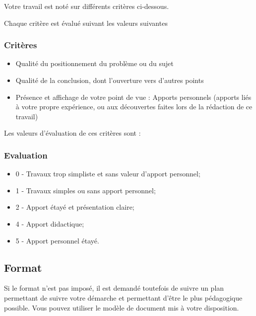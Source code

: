 
Votre travail est noté sur différents critères ci-dessous.

Chaque critère est évalué suivant les valeurs suivantes

\begin{frame}
\frametitle<presentation>{Critères}

\begin{itemize}
  \item Qualité du positionnement du problème ou du sujet
  \item Qualité de la conclusion, dont l'ouverture vers d'autres points
  \item Présence et affichage de votre point de vue : Apports personnels (apports liés à votre propre expérience, ou aux découvertes  faites lors de la rédaction de ce travail)
\end{itemize}

\end{frame}
Les valeurs d'évaluation de ces critères sont :

\begin{frame}
\frametitle<presentation>{Evaluation}

\begin{itemize}
  \item 0 - Travaux trop simpliste et sans valeur d'apport personnel;
  \item 1 - Travaux simples ou sans apport personnel;
  \item 2 - Apport étayé et présentation claire;
  \item 4 - Apport didactique;
  \item 5 - Apport personnel étayé.
\end{itemize}
\end{frame}

\subsection{Format}

Si le format n'est pas imposé, il est demandé toutefois de suivre un plan permettant de suivre votre démarche et permettant d'être le plus pédagogique possible.
Vous pouvez utiliser le modèle de document mis à votre disposition.


